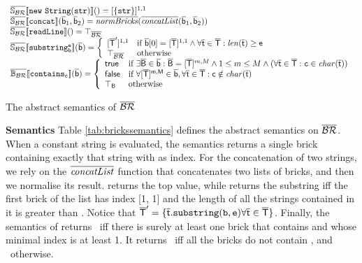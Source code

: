 \documentclass[orivec]{llncs}
\begin{document}
 
\begin{table}[t]
\footnotesize
\[
\begin{array}{l}
\mathbb{\overline{\mathit{\mathbb{S_{\mathsf{\mathcal{BR}}}}}}}\llbracket \mathtt{\mathtt{new\ String(str)}} \rrbracket() = [\{\mathtt{str}\}]^{1,1}\\
\mathbb{\overline{\mathit{\mathbb{S_{\mathsf{\mathcal{BR}}}}}}}\llbracket \mathtt{\mathtt{concat}} \rrbracket(\mathsf{\overline{b}}_1, \mathsf{\overline{b}}_2) = \overline{\mathit{normBricks}}(\overline{\mathit{concatList}}(\mathsf{\overline{b}}_1, \mathsf{\overline{b}}_2))\\
\mathbb{\overline{\mathit{\mathbb{S_{\mathsf{\mathcal{BR}}}}}}}\llbracket \mathtt{\mathtt{readLine}} \rrbracket() = \top_{\mathsf{\overline{\mathsf{\mathcal{BR}}}}}\\
\mathbb{\overline{\mathit{\mathbb{S_{\mathsf{\mathcal{BR}}}}}}}\llbracket \mathtt{\mathtt{substring_b^e}} \rrbracket(\mathsf{\overline{b}}) = 
\left\{
\begin{array}{ll}
[\mathsf{\overline{T}}^\prime]^{1,1} & \textrm{if } \mathsf{\overline{b}}[0] = [\mathsf{\overline{T}}]^{1,1} \land  \forall \mathsf{\overline{t}} \in \mathsf{\overline{T}} : \mathit{len}(\mathsf{\overline{t}}) \ge \mathsf{e}\\
\top_{\mathsf{\overline{\mathsf{\mathcal{BR}}}}} & \textrm{otherwise}
\end{array}
\right.\\
\mathbb{\overline{\mathit{\mathbb{B_{\mathsf{\mathcal{BR}}}}}}}\llbracket \mathtt{\mathtt{contains_c}} \rrbracket(\mathsf{\overline{b}}) = 
\left\{
\begin{array}{ll}
\mathsf{true} & \mbox{if } \exists \mathsf{\overline{B}} \in \mathsf{\overline{b}} : \mathsf{\overline{B}} = [\mathsf{\overline{T}}]^{m,M} \land 1 \leq m \leq M \land (\forall \mathsf{\overline{t}} \in \mathsf{\overline{T}} : \mathtt{c} \in \mathit{char}(\mathsf{\overline{t}}))\\
\mathsf{false} & \mbox{if } \forall [\mathsf{\overline{T}}]^{\mathsf{m},\mathsf{M}} \in \mathsf{\overline{b}}, \forall \mathsf{\overline{t}} \in \mathsf{\overline{T}} : \mathsf{c} \notin \mathit{char}(\mathsf{\overline{t}}) \\
\mathsf{\top_B} & \textrm{otherwise}
\end{array}
\right.\\
\end{array}
\]
 
\caption{The abstract semantics of $\mathsf{\overline{\mathsf{\mathcal{BR}}}}$}
\label{tab:brickssemantics}
\end{table}
\noindent \textbf{Semantics} Table \ref{tab:brickssemantics} defines the abstract semantics on $\mathsf{\overline{\mathsf{\mathcal{BR}}}}$. When a constant string is evaluated, the semantics returns a single brick containing exactly that string with \cel{[1, 1]} as index. For the concatenation of two strings, we rely on the $\overline{\mathit{concatList}}$ function that concatenates two lists of bricks, and then we normalise its result.  returns the top value, while  returns the substring iff the first brick of the list has index [1, 1] and the length of all the strings contained in it is greater than . Notice that $\mathsf{\overline{T}}^\prime = \{ \mathsf{\overline{t}}\mathtt{.substring(b, e)} \forall \mathsf{\overline{t}} \in \mathsf{\overline{T}} \}$. Finally, the semantics of  returns \true\ iff there is surely at least one brick that contains  and whose minimal index is at least 1. It returns \false\ iff all the bricks do not contain , and \booltop\ otherwise.
\end{document}
